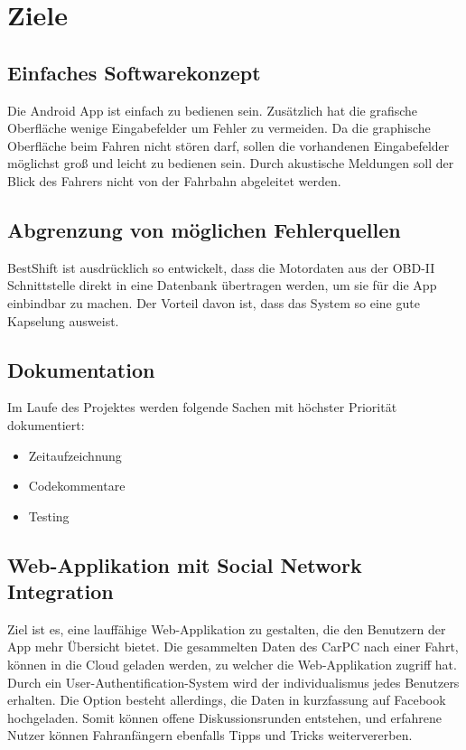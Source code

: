 \section{Ziele}
\subsection{Einfaches Softwarekonzept}
Die Android App ist einfach zu bedienen sein. Zusätzlich hat die grafische Oberfläche wenige Eingabefelder um Fehler zu vermeiden.
Da die graphische Oberfläche beim Fahren nicht stören darf, sollen die vorhandenen Eingabefelder möglichst groß und leicht zu bedienen sein. Durch akustische Meldungen soll der Blick des Fahrers nicht von der Fahrbahn abgeleitet werden.

\subsection{Abgrenzung von möglichen Fehlerquellen}
BestShift ist ausdrücklich so entwickelt, dass die Motordaten aus der OBD-II Schnittstelle direkt in eine Datenbank übertragen werden, um sie für die App einbindbar zu machen. Der Vorteil davon ist, dass das System so eine gute Kapselung ausweist.

\subsection{Dokumentation}
Im Laufe des Projektes werden folgende Sachen mit höchster Priorität dokumentiert:
\begin{itemize}
\item Zeitaufzeichnung
\item Codekommentare
\item Testing
\end{itemize}

\subsection{Web-Applikation mit Social Network Integration}
Ziel ist es, eine lauffähige Web-Applikation zu gestalten, die den Benutzern der App mehr Übersicht bietet.
Die gesammelten Daten des CarPC nach einer Fahrt, können in die Cloud geladen werden, zu welcher die Web-Applikation zugriff hat.
Durch ein User-Authentification-System wird der individualismus jedes Benutzers erhalten.
Die Option besteht allerdings, die Daten in kurzfassung auf Facebook hochgeladen.
Somit können offene Diskussionsrunden entstehen, und erfahrene Nutzer können Fahranfängern ebenfalls Tipps und Tricks weitervererben.


